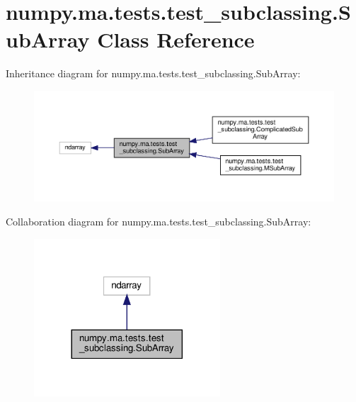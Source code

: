 \hypertarget{classnumpy_1_1ma_1_1tests_1_1test__subclassing_1_1SubArray}{}\section{numpy.\+ma.\+tests.\+test\+\_\+subclassing.\+Sub\+Array Class Reference}
\label{classnumpy_1_1ma_1_1tests_1_1test__subclassing_1_1SubArray}


Inheritance diagram for numpy.\+ma.\+tests.\+test\+\_\+subclassing.\+Sub\+Array\+:
\nopagebreak
\begin{figure}[H]
\begin{center}
\leavevmode
\includegraphics[width=350pt]{classnumpy_1_1ma_1_1tests_1_1test__subclassing_1_1SubArray__inherit__graph}
\end{center}
\end{figure}


Collaboration diagram for numpy.\+ma.\+tests.\+test\+\_\+subclassing.\+Sub\+Array\+:
\nopagebreak
\begin{figure}[H]
\begin{center}
\leavevmode
\includegraphics[width=197pt]{classnumpy_1_1ma_1_1tests_1_1test__subclassing_1_1SubArray__coll__graph}
\end{center}
\end{figure}
